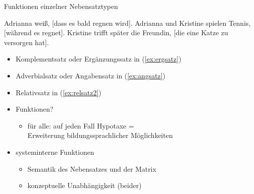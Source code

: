 \begin{frame}
  {Funktionen einzelner Nebensatztypen}
  \pause
  \begin{exe}
    \ex Adrianna weiß, [\alert{dass es bald regnen wird}].\label{ex:ergsatz}
    \pause
    \ex Adrianna und Kristine spielen Tennis, [\alert{während es regnet}].\label{ex:angsatz}
    \pause
    \ex Kristine trifft später die Freundin, [\alert{die eine Katze zu versorgen hat}].\label{ex:relsatz2}
  \end{exe}
  \pause
  \Halbzeile
  \begin{itemize}[<+->]
    \item \alert{Komplementsatz} oder \alert{Ergänzungssatz} in (\ref{ex:ergsatz})
    \item \alert{Adverbialsatz} oder \alert{Angabensatz} in (\ref{ex:angsatz})
    \item \alert{Relativsatz} in (\ref{ex:relsatz2})
    \item Funktionen?
      \begin{itemize}[<+->]
        \item für alle: auf jeden Fall \alert{Hypotaxe =\\
          Erweiterung bildungssprachlicher Möglichkeiten}
      \end{itemize}
    \item systeminterne Funktionen
      \begin{itemize}[<+->]
        \item Semantik des Nebensatzes und der Matrix
        \item konzeptuelle Unabhängigkeit (beider)
      \end{itemize}
  \end{itemize}
\end{frame}

